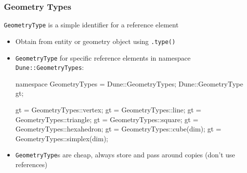 \documentclass[aspectratio=169,11pt]{beamer}
\theoremstyle{definition}
\begin{document}
\begin{frame}[fragile]
  \frametitle{Geometry Types}
  \lstinline!GeometryType! is a simple identifier for a reference element
  \begin{itemize}
  \item Obtain from entity or geometry object using \lstinline!.type()!
  \item \lstinline!GeometryType! for specific reference elements in namespace \lstinline!Dune::GeometryTypes!:
\begin{cppcode}
namespace GeometryTypes = Dune::GeometryTypes;
Dune::GeometryType gt;

gt = GeometryTypes::vertex;
gt = GeometryTypes::line;
gt = GeometryTypes::triangle;
gt = GeometryTypes::square;
gt = GeometryTypes::hexahedron;
gt = GeometryTypes::cube(dim);
gt = GeometryTypes::simplex(dim);
\end{cppcode}
\item \lstinline!GeometryType!s are cheap, always store and pass around copies (don't use references)
  \end{itemize}

\end{frame}
\end{document}
